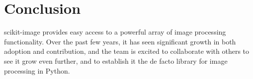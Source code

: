 
\section*{Conclusion}
  \label{sec:conclusion}

  scikit-image provides easy access to a powerful array of image processing functionality. Over the past few years, it has seen significant growth in both adoption and contribution, and the team is excited to collaborate with others to see it grow even further, and to establish it the de facto library for image processing in Python.
